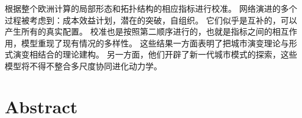 {根据整个欧洲计算的局部形态和拓扑结构的相应指标进行校准。%
网络演进的多个过程被考虑到：成本效益计划，潜在的突破，自组织。 它们似乎是互补的，可以产生所有的真实配置。%
校准也是按照第二顺序进行的，也就是指标之间的相互作用，模型重现了现有情况的多样性。%
这些结果一方面表明了把城市演变理论与形式演变相结合的理论建构。 另一方面，他们开辟了新一代城市模式的探索，这些模型将不得不整合多尺度协同进化动力学。%
}






\newpage

\chapter*{Abstract}













